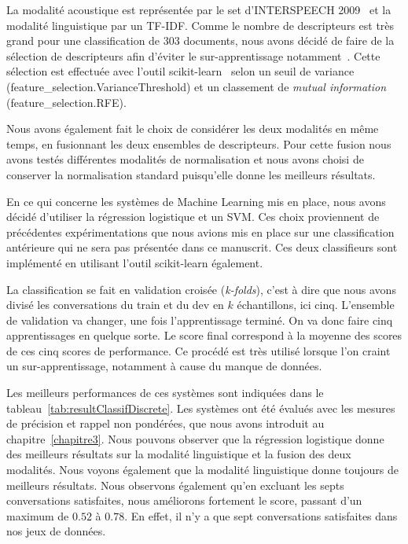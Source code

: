 La modalité acoustique est représentée par le set d'INTERSPEECH 2009~\cite{OPENSMILE} et la modalité linguistique par un TF-IDF. Comme le nombre de descripteurs est très grand pour une classification de 303 documents, nous avons décidé de faire de la sélection de descripteurs afin d'éviter le sur-apprentissage notamment~\cite{Tahon2016}. Cette sélection est effectuée avec l'outil scikit-learn~\cite{scikitlearn} selon un seuil de variance (feature\_selection.VarianceThreshold) et un classement de \textit{mutual information} (feature\_selection.RFE).

Nous avons également fait le choix de considérer les deux modalités en même temps, en fusionnant les deux ensembles de descripteurs. Pour cette fusion nous avons testés différentes modalités de normalisation et nous avons choisi de conserver la normalisation standard puisqu'elle donne les meilleurs résultats.

En ce qui concerne les systèmes de Machine Learning mis en place, nous avons décidé d'utiliser la régression logistique et un SVM. Ces choix proviennent de précédentes expérimentations que nous avions mis en place sur une classification antérieure qui ne sera pas présentée dans ce manuscrit. Ces deux classifieurs sont implémenté en utilisant l'outil scikit-learn également. %

La classification se fait en validation croisée (\textit{k-folds}), c'est à dire que nous avons divisé les conversations du train et du dev en $k$ échantillons, ici cinq. L'ensemble de validation va changer, une fois l'apprentissage terminé. On va donc faire cinq apprentissages en quelque sorte. Le score final correspond à la moyenne des scores de ces cinq scores de performance. Ce procédé est très utilisé lorsque l'on craint un sur-apprentissage, notamment à cause du manque de données.



Les meilleurs performances de ces systèmes sont indiquées dans le tableau~\ref{tab:resultClassifDiscrete}. Les systèmes ont été évalués avec les mesures de précision et rappel non pondérées, que nous avons introduit au chapitre~\ref{chapitre3}. Nous pouvons observer que la régression logistique donne des meilleurs résultats sur la modalité linguistique et la fusion des deux modalités. Nous voyons également que la modalité linguistique donne toujours de meilleurs résultats. Nous observons également qu'en excluant les septs conversations satisfaites, nous améliorons fortement le score, passant d'un maximum de $0.52$ à $0.78$. En effet, il n'y a que sept conversations satisfaites dans nos jeux de données.

